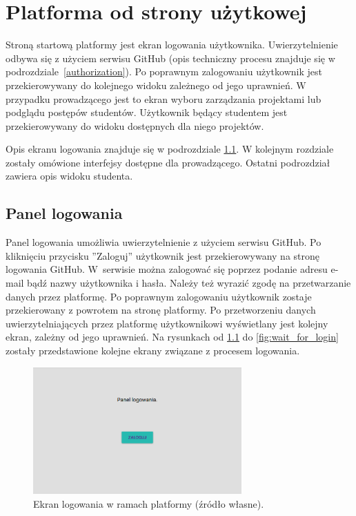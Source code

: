 \chapter{Platforma od strony użytkowej}
\label{chapter:interfaces}

Stroną startową platformy jest ekran logowania użytkownika.
Uwierzytelnienie odbywa się z użyciem serwisu GitHub (opis techniczny procesu znajduje się w podrozdziale~\ref{authorization}).
Po poprawnym zalogowaniu użytkownik jest przekierowywany do kolejnego widoku zależnego od jego uprawnień.
W przypadku prowadzącego jest to ekran wyboru zarządzania projektami lub podglądu postępów studentów.
Użytkownik będący studentem jest przekierowywany do widoku dostępnych dla niego projektów.

Opis ekranu logowania znajduje się w podrozdziale \ref{fe_login}.
W kolejnym rozdziale zostały omówione interfejsy dostępne dla prowadzącego.
Ostatni podrozdział zawiera opis widoku studenta.

\section{Panel logowania}
\label{fe_login}

Panel logowania umożliwia uwierzytelnienie z użyciem serwisu GitHub.
Po kliknięciu przycisku ”Zaloguj” użytkownik jest przekierowywany na stronę logowania GitHub.
W~serwisie można zalogować się poprzez podanie adresu e-mail bądź nazwy użytkownika i hasła.
Należy też wyrazić zgodę na przetwarzanie danych przez platformę.
Po poprawnym zalogowaniu użytkownik zostaje przekierowany z powrotem na stronę platformy.
Po przetworzeniu danych uwierzytelniających przez platformę użytkownikowi wyświetlany jest kolejny ekran, zależny od jego uprawnień.
Na rysunkach od \ref{fig:log_in_button} do \ref{fig:wait_for_login} zostały przedstawione kolejne ekrany związane z procesem logowania.

\vfill

\begin{figure}[h]
    \centering
    \includegraphics[width = 8cm]{chapter04/log_in_button.png}
    \caption{Ekran logowania w ramach platformy (źródło własne).}
    \label{fig:log_in_button}
\end{figure}

